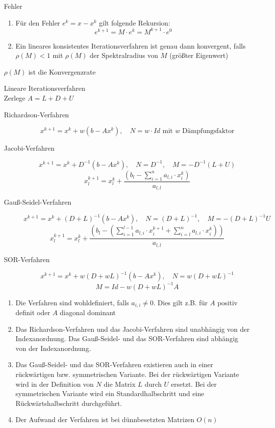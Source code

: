 \begin{theorem} Fehler
	\begin{enumerate}
		\item Für den Fehler $e^{k}=x-x^{k}$ gilt folgende Rekursion:
		$$e^{k+1}=M\cdot e^{k}=M^{k+1}\cdot e^{0}$$
		\item Ein lineares konsistentes Iterationsverfahren ist genau dann konvergent, falls $\rho(M)<1$ mit $\rho(M)$ der
		Spektralradius von $M$ (größter Eigenwert)
	\end{enumerate}
\end{theorem}
\begin{remark}
	$\rho(M)$  ist die Konvergenzrate
\end{remark}

\begin{definition}
	 Lineare Iterationsverfahren
	\\
	Zerlege $A=L+D+U$
	\begin{description}
		\item[Richardson-Verfahren]
			$$x^{k+1}=x^{k}+w(b-Ax^{k}),\quad N=w\cdot Id \text{ mit $w$ Dämpfungsfaktor}$$
		\item[Jacobi-Verfahren]
			$$x^{k+1}=x^{k} + D^{-1}(b-Ax^{k}),\quad N=D^{-1},\quad M=-D^{-1}(L+U)$$
			$$x_{l}^{k+1}=x_{l}^{k}+\frac{(b_{l}-\sum_{i=1}^{n}a_{l,i}\cdot x_{i}^{k})}{a_{l,l}}$$
		\item[Gauß-Seidel-Verfahren]
			$$x^{k+1}=x^{k}+(D+L)^{-1}(b-Ax^{k}),\quad N=(D+L)^{-1},\quad M=-(D+L)^{-1}U$$
			$$x_{l}^{k+1}=x_{l}^{k}+\frac{(b_{l}-(\sum_{i=1}^{l-1}a_{l,i}\cdot x_{i}^{k+1} + \sum_{i=l}^{n}a_{l,i}\cdot x_{i}^{k}))}{a_{l,l}}$$
		\item[SOR-Verfahren]
			$$x^{k+1}=x^{k} + w(D+wL)^{-1}(b-Ax^{k}),\quad N=w(D+wL)^{-1}$$
			$$M=Id-w(D+wL)^{-1}A$$
	\end{description}
\end{definition}

\begin{remark}
	\begin{enumerate}
		\item Die Verfahren sind wohldefiniert, falls $a_{i,i}\not = 0$. Dies gilt z.B. für $A$ positiv definit oder $A$ diagonal dominant
		\item Das Richardson-Verfahren und das Jacobi-Verfahren sind unabhängig von der Indexanordnung. Das Gauß-Seidel- und das
		SOR-Verfahren sind abhängig von der Indexanordnung.
		\item Das Gauß-Seidel- und das SOR-Verfahren existieren auch in einer rückwärtigen bzw. symmetrischen Variante. Bei der 
		rückwärtigen Variante wird in der Definition von $N$ die Matrix $L$ durch $U$ ersetzt. Bei der symmetrischen Variante
		wird ein Standardhalbschritt und eine Rückwärtshalbschritt durchgeführt.
		\item Der Aufwand der Verfahren ist bei dünnbesetzten Matrizen $O(n)$ 
	\end{enumerate}
\end{remark}
